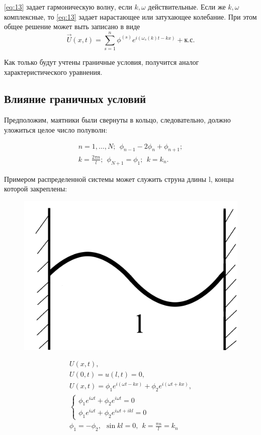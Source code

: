\eqref{eq:13} задает гармоническую волну, если $k, \omega$ действительные. Если же $k, \omega$ комплексные, то \eqref{eq:13} задает нарастающее или затухающее колебание. При этом общее решение может выть записано в виде 
\begin{equation*}
	\vec{U}(x,t)=\sum_{s=1}^{n} \phi^{(s)}e^{i(\omega_s(k)t-kx)} + \text{к.с}.
\end{equation*}

Как только будут учтены граничные условия, получится аналог характеристического уравнения.

\subsection{Влияние граничных условий}
Предположим, маятники были свернуты в кольцо, следовательно, должно уложиться целое число полуволн: 

\begin{gather*}
	n=1,\dots,N;~~\phi_{n-1}-2\phi_n+\phi_{n+1}; \\
	k=\frac{2\pi n}{l};~~\phi_{N+1}=\phi_1;~~k=k_n.
\end{gather*}	

Примером распределенной системы может служить струна длины l, концы которой закреплены:
\begin{figure}[H]
	\centering
	\includegraphics[width=0.5\linewidth]{fig/fig5.pdf}   
\end{figure}
\begin{gather*}
	U(x,t), \\ U(0,t)=u(l,t)=0, \\ U(x,t)=\phi_1 e^{i(\omega t-kx)}+\phi_2 e^{i(\omega t+kx)}, \\
	\begin{cases}
		\phi_1 e^{i\omega t}+\phi_2 e^{i\omega t}=0 \\
		\phi_1 e^{i\omega t}+\phi_2 e^{i\omega t+ikl}=0
	\end{cases}
	\\ \phi_1=-\phi_2,~~ \sin{kl}=0,~~ k=\frac{\pi n}{l}=k_n
\end{gather*}

